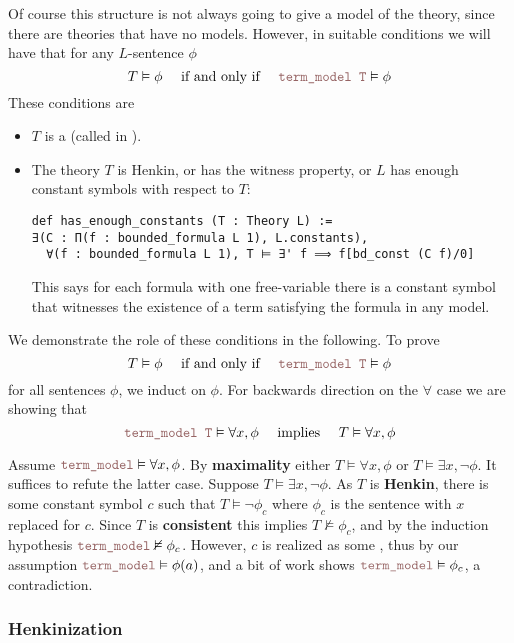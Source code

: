 Of course this structure is not always going to give a model of the
theory, since there are theories that have no models.
However, in suitable conditions we will have that for any $L$-sentence $\phi$
\[
  T \vDash \phi \quad \text{ if and only if } \quad
  \code{term\_model T} \vDash \phi
\]
These conditions are
\begin{itemize}
  \item $T$ is a 
        (called  in ).
  \item The theory $T$ is Henkin, or has the witness property,
        or $L$ has enough constant symbols with respect to $T$:
\begin{lstlisting}
def has_enough_constants (T : Theory L) :=
∃(C : Π(f : bounded_formula L 1), L.constants),
  ∀(f : bounded_formula L 1), T ⊨ ∃' f ⟹ f[bd_const (C f)/0] \end{lstlisting}
        This says for each formula with one free-variable
        there is a constant symbol that witnesses the
        existence of a term satisfying the formula in any model.
\end{itemize}

We demonstrate the role of these conditions in the following.
To prove
\[ T \vDash \phi \quad \text{ if and only if } \quad
  \code{term\_model T} \vDash \phi \]
for all sentences $\phi$, we induct on $\phi$.
For backwards direction on the $\forall$ case
we are showing that
\[ \code{term\_model T} \vDash \forall x, \phi \quad \text{ implies }
  \quad T \vDash \forall x, \phi \]

Assume $\code{term\_model} \vDash \forall x, \phi$.
By \textbf{maximality} either $T \vDash \forall x, \phi$ or
$T \vDash \exists x, \neg \phi$.
It suffices to refute the latter case.
Suppose $T \vDash \exists x, \neg \phi$.
As $T$ is \textbf{Henkin},
there is some constant symbol $c$ such that $T \vDash \neg \phi_{c}$
where $\phi_{c}$ is the sentence with $x$ replaced for $c$.
Since $T$ is \textbf{consistent} this implies $T \nvDash \phi_{c}$,
and by the induction hypothesis $\code{term\_model} \nvDash \phi_{c}$.
However, $c$ is realized as some ,
thus by our assumption $\code{term\_model} \vDash \phi(a)$,
and a bit of work shows $\code{term\_model} \vDash \phi_{c}$,
a contradiction.

\subsubsection{Henkinization}

